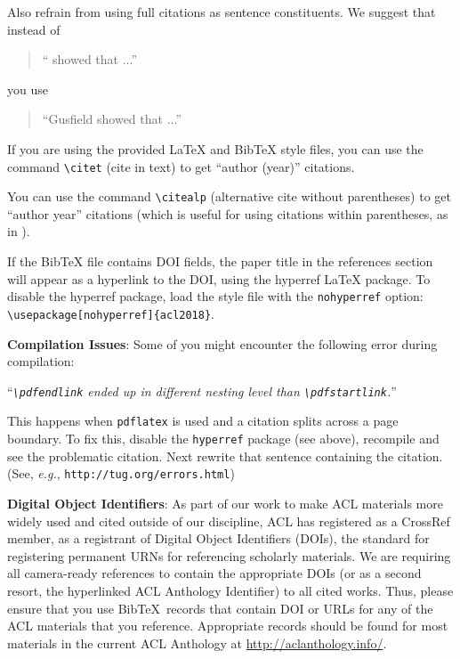 \documentclass[11pt,a4paper]{article}
\begin{document}
Also refrain from using full citations
as sentence constituents.
We suggest that instead of
\begin{quote}
  ``\cite{Gusfield:97} showed that ...''
\end{quote}
you use
\begin{quote}
``Gusfield    showed that ...''
\end{quote}

If you are using the provided \LaTeX{} and Bib\TeX{} style files, you
can use the command \verb|\citet| (cite in text)
to get ``author (year)'' citations.

You can use the command \verb|\citealp| (alternative cite without
parentheses) to get ``author year'' citations (which is useful for
using citations within parentheses, as in \citealp{Gusfield:97}).

If the Bib\TeX{} file contains DOI fields, the paper
title in the references section will appear as a hyperlink
to the DOI, using the hyperref \LaTeX{} package.
To disable the hyperref package, load the style file
with the \verb|nohyperref| option:
\verb|\usepackage[nohyperref]{acl2018}|.

\textbf{Compilation Issues}: Some of you might encounter the following error during compilation:

``{\em \verb|\pdfendlink| ended up in different nesting level than \verb|\pdfstartlink|.}''

This happens when \verb|pdflatex| is used and a citation splits across a page boundary. To fix this, disable the \verb|hyperref| package (see above), recompile and see the problematic citation.
Next rewrite that sentence containing the citation. (See, {\em e.g.}, {\small\tt http://tug.org/errors.html})

\textbf{Digital Object Identifiers}:  As part of our work to make ACL
materials more widely used and cited outside of our discipline, ACL
has registered as a CrossRef member, as a registrant of Digital Object
Identifiers (DOIs), the standard for registering permanent URNs for
referencing scholarly materials. We are requiring all
camera-ready references to contain the appropriate DOIs (or as a
second resort, the hyperlinked ACL Anthology Identifier) to all cited
works.  Thus, please ensure that you use Bib\TeX\ records that contain
DOI or URLs for any of the ACL materials that you reference.
Appropriate records should be found for most materials in the current
ACL Anthology at \url{http://aclanthology.info/}.
\end{document}
